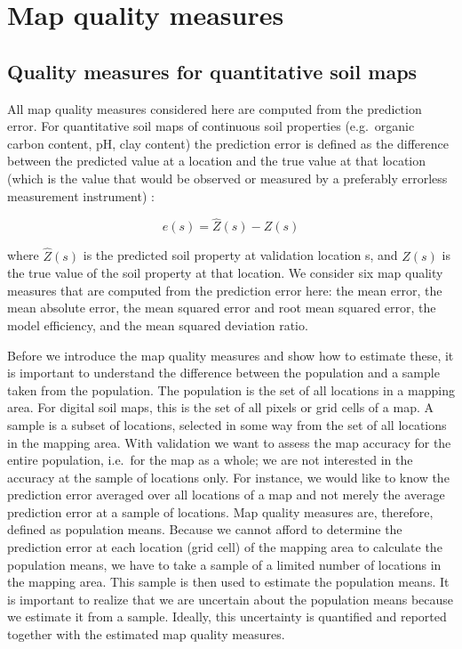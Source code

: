 \documentclass[10pt,b5paper,]{book}
\theoremstyle{definition}
\theoremstyle{definition}
\theoremstyle{definition}
\theoremstyle{remark}
\begin{document}
\hypertarget{QualMeasures}{%
\section{Map quality measures}\label{QualMeasures}}

\hypertarget{quality-measures-for-quantitative-soil-maps}{%
\subsection{Quality measures for quantitative soil
maps}\label{quality-measures-for-quantitative-soil-maps}}

All map quality measures considered here are computed from the
prediction error. For quantitative soil maps of continuous soil
properties (e.g.~organic carbon content, pH, clay content) the
prediction error is defined as the difference between the predicted
value at a location and the true value at that location (which is the
value that would be observed or measured by a preferably errorless
measurement instrument) \citep{brus2011sampling}:

\begin{equation}
e(s) = \hat{Z}(s) - Z(s)
\end{equation}

where \({\hat{Z}(s)}\) is the predicted soil property at validation
location s, and \({Z(s)}\) is the true value of the soil property at
that location. We consider six map quality measures that are computed
from the prediction error here: the mean error, the mean absolute error,
the mean squared error and root mean squared error, the model
efficiency, and the mean squared deviation ratio.

Before we introduce the map quality measures and show how to estimate
these, it is important to understand the difference between the
population and a sample taken from the population. The population is the
set of all locations in a mapping area. For digital soil maps, this is
the set of all pixels or grid cells of a map. A sample is a subset of
locations, selected in some way from the set of all locations in the
mapping area. With validation we want to assess the map accuracy for the
entire population, i.e.~for the map as a whole; we are not interested in
the accuracy at the sample of locations only. For instance, we would
like to know the prediction error averaged over all locations of a map
and not merely the average prediction error at a sample of locations.
Map quality measures are, therefore, defined as population means.
Because we cannot afford to determine the prediction error at each
location (grid cell) of the mapping area to calculate the population
means, we have to take a sample of a limited number of locations in the
mapping area. This sample is then used to estimate the population means.
It is important to realize that we are uncertain about the population
means because we estimate it from a sample. Ideally, this uncertainty is
quantified and reported together with the estimated map quality
measures.
\end{document}
